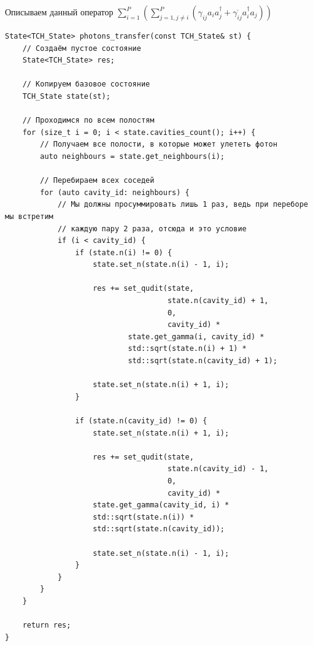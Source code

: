 \documentclass[12pt,fleqn]{article}
\begin{document}
        Описываем данный оператор $\sum\limits_{i = 1}^{P}(\sum\limits_{j = 1, j \neq i}^{P}({\gamma_{ij}}{a_i}a^{\dagger}_j + \overline{{\gamma_{ij}}}a^{\dagger}_i{a_j}))$
\begin{mdframed}[linecolor=black, topline=true, bottomline=true,
leftline=false, rightline=false]
\begin{verbatim}
State<TCH_State> photons_transfer(const TCH_State& st) {
    // Создаём пустое состояние
    State<TCH_State> res;

    // Копируем базовое состояние
    TCH_State state(st);

    // Проходимся по всем полостям
    for (size_t i = 0; i < state.cavities_count(); i++) {
        // Получаем все полости, в которые может улететь фотон
        auto neighbours = state.get_neighbours(i);

        // Перебираем всех соседей
        for (auto cavity_id: neighbours) {
            // Мы должны просуммировать лишь 1 раз, ведь при переборе мы встретим
            // каждую пару 2 раза, отсюда и это условие
            if (i < cavity_id) {
                if (state.n(i) != 0) {
                    state.set_n(state.n(i) - 1, i);

                    res += set_qudit(state,
                                     state.n(cavity_id) + 1,
                                     0,
                                     cavity_id) *
                            state.get_gamma(i, cavity_id) * 
                            std::sqrt(state.n(i) + 1) *
                            std::sqrt(state.n(cavity_id) + 1);

                    state.set_n(state.n(i) + 1, i);
                }
    
                if (state.n(cavity_id) != 0) {
                    state.set_n(state.n(i) + 1, i);

                    res += set_qudit(state,
                                     state.n(cavity_id) - 1,
                                     0,
                                     cavity_id) *
                    state.get_gamma(cavity_id, i) * 
                    std::sqrt(state.n(i)) *
                    std::sqrt(state.n(cavity_id));

                    state.set_n(state.n(i) - 1, i);
                }
            }
        } 
    }

    return res;
}
\end{verbatim}
\end{mdframed}
\end{document}

